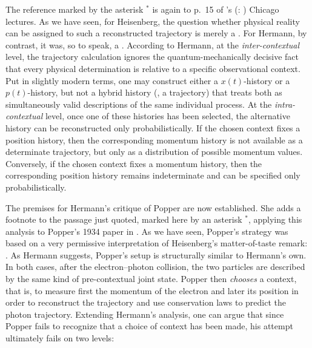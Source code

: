 \documentclass[pdflatex]{sn-jnl}
\renewcommand{\citets}[2][]{\citeauthor{#2}'s (\citeyear{#2}\if\relax\detokenize{#1}\relax\else: #1\fi)}
\newcommand{\NW}{\jt{Die Naturwissenschaften}\xspace}
\newcommand{\NGQ}[2]{\citep[#1/#2]{Hermann1935}}
\providecommand{\DIFaddend}{} %
\begin{document}
\DIFaddend %
The reference marked by the asterisk $^{\ast}$ is again to p.~15 of \citets{Heisenberg1930} Chicago lectures. As we have seen, for Heisenberg, the question whether physical reality can be assigned to such a reconstructed trajectory is merely a . For Hermann, by contrast, it was, so to speak, a . According to Hermann, at the \emph{inter-contextual} level, the trajectory calculation ignores the quantum-mechanically decisive fact that every physical determination is relative to a specific observational context. Put in slightly modern terms, one may construct either a $x(t)$-history or a $p(t)$-history, but not a hybrid history (\ie, a trajectory) that treats both as simultaneously valid descriptions of the same individual process. At the \emph{intra-contextual} level, once one of these histories has been selected, the alternative history can be reconstructed only probabilistically. If the chosen context fixes a position history, then the corresponding momentum history is not available as a determinate trajectory, but only as a distribution of possible momentum values. Conversely, if the chosen context fixes a momentum history, then the corresponding position history remains indeterminate and can be specified only probabilistically.

The premises for Hermann's critique of Popper are now established. She adds a footnote to the passage just quoted, marked here by an asterisk $^{\ast}$, applying this analysis to Popper's 1934 paper in \NW. As we have seen, Popper's strategy was based on a very permissive interpretation of Heisenberg's matter-of-taste remark:  \NGQ{123}{263\fn{10}}. As Hermann suggests, Popper's setup is structurally similar to Hermann's own. In both cases, after the electron--photon collision, the two particles are described by the same kind of pre-contextual joint state. Popper then \emph{chooses} a context, that is, to measure first the momentum of the electron and later its position in order to reconstruct the trajectory and use conservation laws to predict the photon trajectory. Extending Hermann's analysis, one can argue that since Popper fails to recognize that a choice of context has been made, his attempt ultimately fails on two levels:
\end{document}
